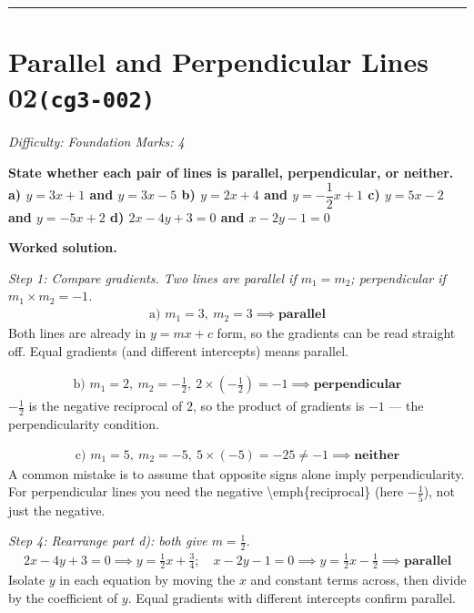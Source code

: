 \documentclass[11pt]{article}
\newcommand{\question}[1]{\par\medskip\noindent\textbf{#1}\par}
\begin{document}
\medskip\hrule

\section*{Parallel and Perpendicular Lines 02\quad\small\texttt{(cg3-002)}}
\textit{Difficulty: Foundation \quad\textbar\quad Marks: 4}

\question{State whether each pair of lines is parallel, perpendicular, or neither. \\[3pt] a) \( y = 3x + 1 \) and \( y = 3x - 5 \) b) \( y = 2x + 4 \) and \( y = -\dfrac{1}{2}x + 1 \) c) \( y = 5x - 2 \) and \( y = -5x + 2 \) d) \( 2x - 4y + 3 = 0 \) and \( x - 2y - 1 = 0 \)}

\textbf{Worked solution.}

\textit{Step 1: Compare gradients. Two lines are parallel if \( m_1 = m_2 \); perpendicular if \( m_1 \times m_2 = -1 \).}
\[\begin{gathered}
\text{a) } m_1 = 3,\ m_2 = 3 \implies \textbf{parallel}
\end{gathered}\]
Both lines are already in \( y = mx + c \) form, so the gradients can be read straight off. Equal gradients (and different intercepts) means parallel.

\[\begin{gathered}
\text{b) } m_1 = 2,\ m_2 = -\tfrac{1}{2},\ 2 \times (-\tfrac{1}{2}) = -1 \implies \textbf{perpendicular}
\end{gathered}\]
\( -\tfrac{1}{2} \) is the negative reciprocal of \( 2 \), so the product of gradients is \( -1 \) --- the perpendicularity condition.

\[\begin{gathered}
\text{c) } m_1 = 5,\ m_2 = -5,\ 5 \times (-5) = -25 \ne -1 \implies \textbf{neither}
\end{gathered}\]
A common mistake is to assume that opposite signs alone imply perpendicularity. For perpendicular lines you need the negative \textbackslash emph\{reciprocal\} (here \( -\tfrac{1}{5} \)), not just the negative.

\textit{Step 4: Rearrange part d): both give \( m = \frac{1}{2} \).}
\[\begin{gathered}
2x - 4y + 3 = 0 \implies y = \tfrac{1}{2}x + \tfrac{3}{4}; \quad x - 2y - 1 = 0 \implies y = \tfrac{1}{2}x - \tfrac{1}{2} \implies \textbf{parallel}
\end{gathered}\]
Isolate \( y \) in each equation by moving the \( x \) and constant terms across, then divide by the coefficient of \( y \). Equal gradients with different intercepts confirm parallel.
\end{document}
